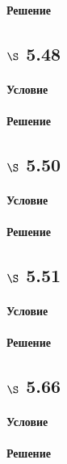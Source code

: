 \documentclass[a4paper,12pt]{article}
\begin{document}
\paragraph*{Решение}

\subsection*{$\S$ 5.48}
\paragraph*{Условие}
\paragraph*{Решение}

\subsection*{$\S$ 5.50}
\paragraph*{Условие}
\paragraph*{Решение}

\subsection*{$\S$ 5.51}
\paragraph*{Условие}
\paragraph*{Решение}

\subsection*{$\S$ 5.66}
\paragraph*{Условие}
\paragraph*{Решение}
\end{document}
